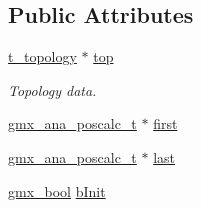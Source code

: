 \subsection*{\-Public \-Attributes}
\begin{DoxyCompactItemize}
\item 
\hyperlink{structt__topology}{t\-\_\-topology} $\ast$ \hyperlink{structgmx__ana__poscalc__coll__t_a1b7c6734d2e656678b990719c01a84e1}{top}
\begin{DoxyCompactList}\small\item\em \-Topology data. \end{DoxyCompactList}\item 
\hyperlink{structgmx__ana__poscalc__t}{gmx\-\_\-ana\-\_\-poscalc\-\_\-t} $\ast$ \hyperlink{structgmx__ana__poscalc__coll__t_a8c4874a7fb6c03f41f28e1296ebe5e1e}{first}
\item 
\hyperlink{structgmx__ana__poscalc__t}{gmx\-\_\-ana\-\_\-poscalc\-\_\-t} $\ast$ \hyperlink{structgmx__ana__poscalc__coll__t_a4eb819a49cc7154f476c1cddc2de1d63}{last}
\item 
\hyperlink{include_2types_2simple_8h_a8fddad319f226e856400d190198d5151}{gmx\-\_\-bool} \hyperlink{structgmx__ana__poscalc__coll__t_a1f5bee1cfbe8cea23330e54b108aec2f}{b\-Init}
\end{DoxyCompactItemize}


